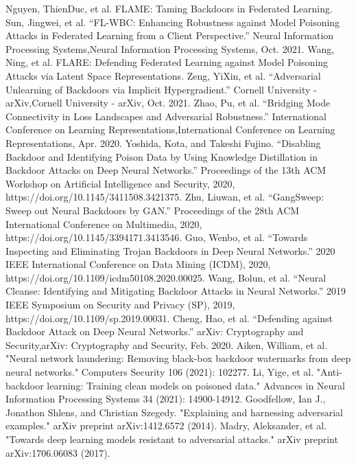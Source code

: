 \documentclass[conference]{IEEEtran}
\begin{document}
\begin{thebibliography}{00}
     Nguyen, ThienDuc, et al. FLAME: Taming Backdoors in Federated Learning.
     Sun, Jingwei, et al. “FL-WBC: Enhancing Robustness against Model Poisoning Attacks in Federated Learning from a Client Perspective.” Neural Information Processing Systems,Neural Information Processing Systems, Oct. 2021.
     Wang, Ning, et al. FLARE: Defending Federated Learning against Model Poisoning Attacks via Latent Space Representations.
     Zeng, YiXin, et al. “Adversarial Unlearning of Backdoors via Implicit Hypergradient.” Cornell University - arXiv,Cornell University - arXiv, Oct. 2021.
     Zhao, Pu, et al. “Bridging Mode Connectivity in Loss Landscapes and Adversarial Robustness.” International Conference on Learning Representations,International Conference on Learning Representations, Apr. 2020.
     Yoshida, Kota, and Takeshi Fujino. “Disabling Backdoor and Identifying Poison Data by Using Knowledge Distillation in Backdoor Attacks on Deep Neural Networks.” Proceedings of the 13th ACM Workshop on Artificial Intelligence and Security, 2020, https://doi.org/10.1145/3411508.3421375.
     Zhu, Liuwan, et al. “GangSweep: Sweep out Neural Backdoors by GAN.” Proceedings of the 28th ACM International Conference on Multimedia, 2020, https://doi.org/10.1145/3394171.3413546.
     Guo, Wenbo, et al. “Towards Inspecting and Eliminating Trojan Backdoors in Deep Neural Networks.” 2020 IEEE International Conference on Data Mining (ICDM), 2020, https://doi.org/10.1109/icdm50108.2020.00025.
     Wang, Bolun, et al. “Neural Cleanse: Identifying and Mitigating Backdoor Attacks in Neural Networks.” 2019 IEEE Symposium on Security and Privacy (SP), 2019, https://doi.org/10.1109/sp.2019.00031.
     Cheng, Hao, et al. “Defending against Backdoor Attack on Deep Neural Networks.” arXiv: Cryptography and Security,arXiv: Cryptography and Security, Feb. 2020.
     Aiken, William, et al. "Neural network laundering: Removing black-box backdoor watermarks from deep neural networks." Computers  Security 106 (2021): 102277.
     Li, Yige, et al. "Anti-backdoor learning: Training clean models on poisoned data." Advances in Neural Information Processing Systems 34 (2021): 14900-14912.
     Goodfellow, Ian J., Jonathon Shlens, and Christian Szegedy. "Explaining and harnessing adversarial examples." arXiv preprint arXiv:1412.6572 (2014).
     Madry, Aleksander, et al. "Towards deep learning models resistant to adversarial attacks." arXiv preprint arXiv:1706.06083 (2017).

\end{thebibliography}
\end{document}
